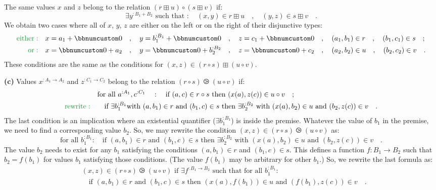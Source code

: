 The same values $x$ and $z$ belong to the relation $(r\boxplus u)\circ(s\boxplus v)$
if:
\[
\exists y^{:B_{1}+B_{2}}\text{ such that }:\quad(x,y)\in r\boxplus u\quad,\quad(y,z)\in s\boxplus v\quad.
\]
We obtain two cases where all of $x$, $y$, $z$ are either on the
left or on the right of their disjunctive types:
\begin{align*}
{\color{greenunder}\text{either}:}\quad & x=a_{1}+\bbnum 0\quad,\quad y=b_{1}^{:B_{1}}+\bbnum 0\quad,\quad z=c_{1}+\bbnum 0\quad,\quad(a_{1},b_{1})\in r\quad,\quad(b_{1},c_{1})\in s\quad;\\
{\color{greenunder}\text{or}:}\quad & x=\bbnum 0+a_{2}\quad,\quad y=\bbnum 0+b_{2}^{:B_{2}}\quad,\quad z=\bbnum 0+c_{2}\quad,\quad(a_{2},b_{2})\in u\quad,\quad(b_{2},c_{2})\in v\quad.
\end{align*}
These conditions are the same as the conditions for $(x,z)\in(r\circ s)\boxplus(u\circ v)$. 

\textbf{(c)} Values $x^{:A_{1}\rightarrow A_{2}}$ and $z^{:C_{1}\rightarrow C_{2}}$
belong to the relation $(r\circ s)\ogreaterthan(u\circ v)$ if:
\begin{align*}
 & \text{for all }a^{:A_{1}},c^{:C_{1}}\quad:\quad\text{if }(a,c)\in r\circ s\text{ then }(x(a),z(c))\in u\circ v\quad;\\
{\color{greenunder}\text{rewrite}:}\quad & \quad\text{if }\exists b_{1}^{:B_{1}}\text{with }(a,b_{1})\in r\text{ and }(b_{1},c)\in s\text{ then }\exists b_{2}^{:B_{2}}\text{ with }(x(a),b_{2})\in u\text{ and }(b_{2},z(c))\in v\quad.
\end{align*}
The last condition is an implication where an existential quantifier
($\exists b_{1}^{:B_{1}}$) is inside the premise. Whatever the value
of $b_{1}$ in the premise, we need to find a corresponding value
$b_{2}$. So, we may rewrite the condition $(x,z)\in(r\circ s)\ogreaterthan(u\circ v)$
as:
\[
\text{for all }b_{1}^{:B_{1}}:\quad\text{if }(a,b_{1})\in r\text{ and }(b_{1},c)\in s\text{ then }\exists b_{2}^{:B_{2}}\text{ with }(x(a),b_{2})\in u\text{ and }(b_{2},z(c))\in v\quad.
\]
The value $b_{2}$ needs to exist for any $b_{1}$ satisfying the
conditions $(a,b_{1})\in r$ and $(b_{1},c)\in s$. This defines a
function $f:B_{1}\rightarrow B_{2}$ such that $b_{2}=f(b_{1})$ for
values $b_{1}$ satisfying those conditions. (The value $f(b_{1})$
may be arbitrary for other $b_{1}$.) So, we rewrite the last formula
as:
\begin{align*}
 & (x,z)\in(r\circ s)\ogreaterthan(u\circ v)\text{ if }\exists f^{:B_{1}\rightarrow B_{2}}\text{ such that}\text{ for all }b_{1}^{:B_{1}}:\\
 & \quad\text{if }(a,b_{1})\in r\text{ and }(b_{1},c)\in s\text{ then }(x(a),f(b_{1}))\in u\text{ and }(f(b_{1}),z(c))\in v\quad.
\end{align*}

